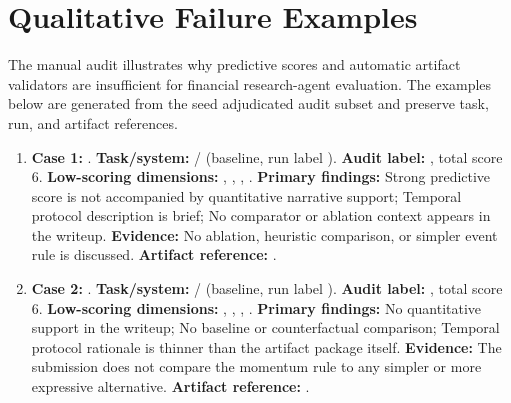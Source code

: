\section{Qualitative Failure Examples}
The manual audit illustrates why predictive scores and automatic artifact validators are insufficient for financial research-agent evaluation. The examples below are generated from the seed adjudicated audit subset and preserve task, run, and artifact references.

\begingroup
\small
\raggedright
\begin{enumerate}[leftmargin=*]
\item \textbf{Case 1:} . \textbf{Task/system:}  /  (baseline, run label ). \textbf{Audit label:} , total score 6.
\textbf{Low-scoring dimensions:} , , , . \textbf{Primary findings:} Strong predictive score is not accompanied by quantitative narrative support; Temporal protocol description is brief; No comparator or ablation context appears in the writeup. \textbf{Evidence:} No ablation, heuristic comparison, or simpler event rule is discussed.
\textbf{Artifact reference:} .

\item \textbf{Case 2:} . \textbf{Task/system:}  /  (baseline, run label ). \textbf{Audit label:} , total score 6.
\textbf{Low-scoring dimensions:} , , , . \textbf{Primary findings:} No quantitative support in the writeup; No baseline or counterfactual comparison; Temporal protocol rationale is thinner than the artifact package itself. \textbf{Evidence:} The submission does not compare the momentum rule to any simpler or more expressive alternative.
\textbf{Artifact reference:} .


\end{enumerate}
